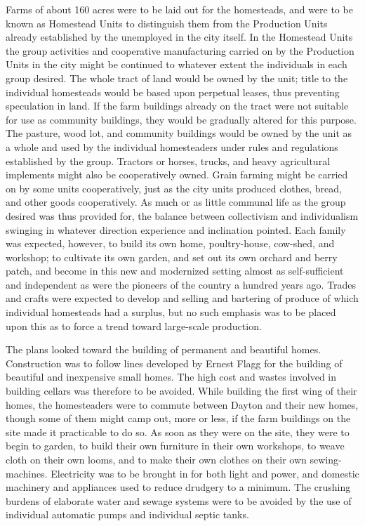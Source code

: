 \documentclass{book}
\begin{document}
Farms of about 160 acres were to be laid out for the homesteads, and were to be known as Homestead Units to distinguish them from the Production Units already established by the unemployed in the city itself. In the Homestead Units the group activities and cooperative manufacturing carried on by the Production Units in the city might be continued to whatever extent the individuals in each group desired. The whole tract of land would be owned by the unit; title to the individual homesteads would be based upon perpetual leases, thus preventing speculation in land. If the farm buildings already on the tract were not suitable for use as community buildings, they would be gradually altered for this purpose. The pasture, wood lot, and community buildings would be owned by the unit as a whole and used by the individual homesteaders under rules and regulations established by the group. Tractors or horses, trucks, and heavy agricultural implements might also be cooperatively owned. Grain farming might be carried on by some units cooperatively, just as the city units produced clothes, bread, and other goods cooperatively. As much or as little communal life as the group desired was thus provided for, the balance between collectivism and individualism swinging in whatever direction experience and inclination pointed. Each family was expected, however, to build its own home, poultry-house, cow-shed, and workshop; to cultivate its own garden, and set out its own orchard and berry patch, and become in this new and modernized setting almost as self-sufficient and independent as were the pioneers of the country a hundred years ago. Trades and crafts were expected to develop and selling and bartering of produce of which individual homesteads had a surplus, but no such emphasis was to be placed upon this as to force a trend toward large-scale production.

The plans looked toward the building of permanent and beautiful homes. Construction was to follow lines developed by Ernest Flagg for the building of beautiful and inexpensive small homes. The high cost and wastes involved in building cellars was therefore to be avoided. While building the first wing of their homes, the homesteaders were to commute between Dayton and their new homes, though some of them might camp out, more or less, if the farm buildings on the site made it practicable to do so. As soon as they were on the site, they were to begin to garden, to build their own furniture in their own workshops, to weave cloth on their own looms, and to make their own clothes on their own sewing-machines. Electricity was to be brought in for both light and power, and domestic machinery and appliances used to reduce drudgery to a minimum. The crushing burdens of elaborate water and sewage systems were to be avoided by the use of individual automatic pumps and individual septic tanks.
\end{document}
